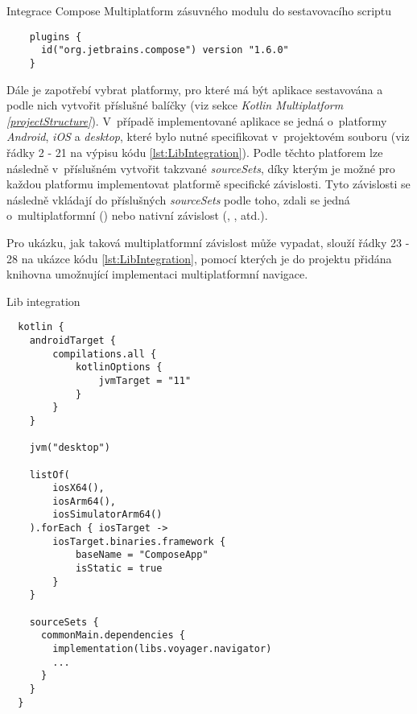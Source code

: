\begin{listing}[H]
\caption{Integrace Compose Multiplatform zásuvného modulu do sestavovacího scriptu}\label{lst:ComposePlugin}
\begin{verbatim}
    plugins {
      id("org.jetbrains.compose") version "1.6.0"
    }
\end{verbatim}
\end{listing}

Dále je zapotřebí vybrat platformy, pro které má být aplikace sestavována a podle nich vytvořit příslušné balíčky (viz sekce \textit{Kotlin Multiplatform \ref{projectStructure}}).
V~případě implementované aplikace se jedná o~platformy \textit{Android}, \textit{iOS} a \textit{desktop}, které bylo nutné specifikovat v~projektovém 
souboru  (viz řádky 2 - 21 na výpisu kódu \ref{lst:LibIntegration}).
Podle těchto platforem lze následně v~příslušném  vytvořit takzvané \textit{sourceSets}, díky kterým je možné
pro každou platformu implementovat platformě specifické závislosti. Tyto závislosti se následně vkládají do příslušných
\textit{sourceSets} podle toho, zdali se jedná o~multiplatformní () nebo nativní závislost (, , atd.).

Pro ukázku, jak taková multiplatformní závislost může vypadat, slouží řádky 23 - 28 na ukázce kódu \ref{lst:LibIntegration}, pomocí 
kterých je do projektu přidána knihovna umožnující implementaci multiplatformní navigace.

\begin{listing}[H]
\caption{Lib integration}\label{lst:LibIntegration}
\begin{verbatim}
  kotlin {
    androidTarget {
        compilations.all {
            kotlinOptions {
                jvmTarget = "11"
            }
        }
    }

    jvm("desktop")

    listOf(
        iosX64(),
        iosArm64(),
        iosSimulatorArm64()
    ).forEach { iosTarget ->
        iosTarget.binaries.framework {
            baseName = "ComposeApp"
            isStatic = true
        }
    }

    sourceSets {
      commonMain.dependencies {
        implementation(libs.voyager.navigator)
        ...
      }
    }
  }  
\end{verbatim}
\end{listing}

